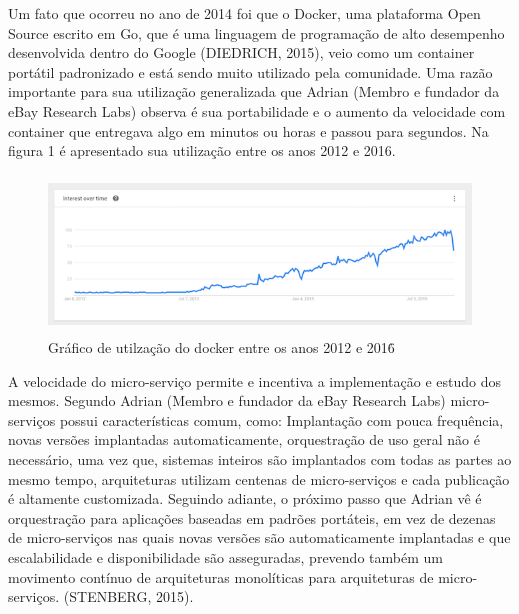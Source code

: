 Um fato que ocorreu no ano de 2014 foi que o Docker, uma plataforma Open Source escrito em Go, que é uma linguagem de programação de alto desempenho desenvolvida dentro do Google (DIEDRICH, 2015), veio como um container portátil padronizado e está sendo muito utilizado pela comunidade. Uma razão importante para sua utilização generalizada que Adrian (Membro e fundador da eBay Research Labs)  observa é sua portabilidade e o aumento da velocidade com container que entregava algo em minutos ou horas e passou para segundos. Na figura 1 é apresentado sua utilização entre os anos 2012 e 2016.



\begin{figure}[h]
\centering
\includegraphics[height=4.2cm]{imagens/docker}
\caption{Gráfico de utilzação do docker entre os anos 2012 e 2016\.}
\label{fig:exemplo}
\end{figure}

A velocidade do micro-serviço permite e incentiva a implementação e estudo dos mesmos. Segundo Adrian (Membro e fundador da eBay Research Labs)  micro-serviços possui características comum, como: Implantação com pouca frequência, novas versões implantadas automaticamente, orquestração de uso geral não é necessário, uma vez que, sistemas inteiros são implantados com todas as partes ao mesmo tempo, arquiteturas utilizam centenas de micro-serviços e cada publicação é altamente customizada.
Seguindo adiante, o próximo passo que Adrian vê é orquestração para aplicações baseadas em padrões portáteis, em vez de dezenas de micro-serviços nas quais novas versões são automaticamente implantadas e que escalabilidade e disponibilidade são asseguradas, prevendo também um movimento contínuo de arquiteturas monolíticas para arquiteturas de micro-serviços. (STENBERG, 2015).

